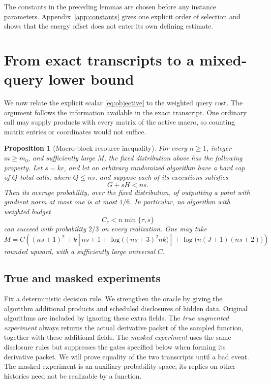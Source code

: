 \documentclass[11pt]{article}
\newtheorem{proposition}[theorem]{Proposition}
\theoremstyle{definition}
\theoremstyle{remark}
\begin{document}
The constants in the preceding lemmas are chosen before any instance
parameters. Appendix~\ref{app:constants} gives one explicit order of
selection and shows that the energy offset does not enter its own
defining estimate.


\section{From exact transcripts to a mixed-query lower bound}\label{sec:information}
We now relate the explicit scalar \eqref{eq:objective} to the weighted query cost.
The argument follows the information available in the exact transcript.
One ordinary call may supply products with every matrix of the active
macro, so counting matrix entries or coordinates would not suffice.

\begin{proposition}[Macro-block resource inequality]\label{prop:resource}
For every $n\ge1$, integer $m\ge m_0$, and sufficiently large $M$, the fixed distribution above has the following property. Let $s=kr$, and let an arbitrary randomized algorithm have a hard cap of $Q$ total calls, where $Q\le ns$, and suppose each of its executions satisfies
\begin{equation}\label{eq:joint-ineq}
 G+sH<ns.
\end{equation}
Then its average probability, over the fixed distribution, of outputting a point with gradient norm at most one is at most $1/6$. In particular, no algorithm with weighted budget
\begin{equation}\label{eq:block-cost}
 C_\tau<n\min\{\tau,s\}
\end{equation}
can succeed with probability $2/3$ on every realization.
One may take
\begin{equation}\label{eq:M-full}
 M=C\left((ns+1)^2+k\left[ns+1+
  \log\big((ns+3)^2nk\big)\right]
  +\log\big(n(J+1)(ns+2)\big)\right)
\end{equation}
rounded upward, with a sufficiently large universal $C$.
\end{proposition}

\subsection{True and masked experiments}
Fix a deterministic decision rule. We strengthen the oracle by giving
the algorithm additional products and scheduled disclosures of hidden
data. Original algorithms are included by ignoring these extra fields.
The \emph{true augmented experiment} always returns the actual derivative
packet of the sampled function, together with these additional fields.
The \emph{masked experiment} uses the same disclosure rules but suppresses
the gates specified below when forming its derivative packet.
We will prove equality of the two transcripts until a bad event.
The masked experiment is an auxiliary probability space; its replies
on other histories need not be realizable by a function.
\end{document}
